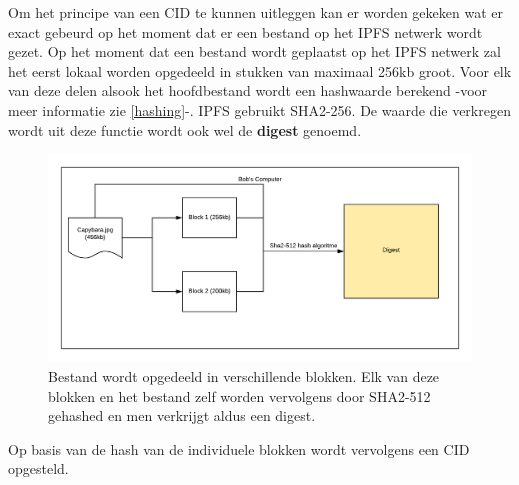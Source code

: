 Om het principe van een CID te kunnen uitleggen kan er worden gekeken wat er exact gebeurd op het moment dat er een bestand op het IPFS netwerk wordt gezet. Op het moment dat een bestand wordt geplaatst op het IPFS netwerk zal het eerst lokaal worden opgedeeld in stukken van maximaal 256kb groot. Voor elk van deze delen alsook het hoofdbestand wordt een hashwaarde berekend -voor meer informatie zie \ref{hashing}-. IPFS gebruikt SHA2-256. De waarde die verkregen wordt uit deze functie wordt ook wel de \textbf{digest} genoemd.\\

\begin{figure}[h!]
	\centering
		\includegraphics[scale=0.6]{ipfs-1.png}
	\caption[IPFS - Stap 1]{Bestand wordt opgedeeld in verschillende blokken. Elk van deze blokken en het bestand zelf worden vervolgens door SHA2-512 gehashed en men verkrijgt aldus een digest. }
\end{figure}

Op basis van de hash van de individuele blokken wordt vervolgens een CID opgesteld. 

